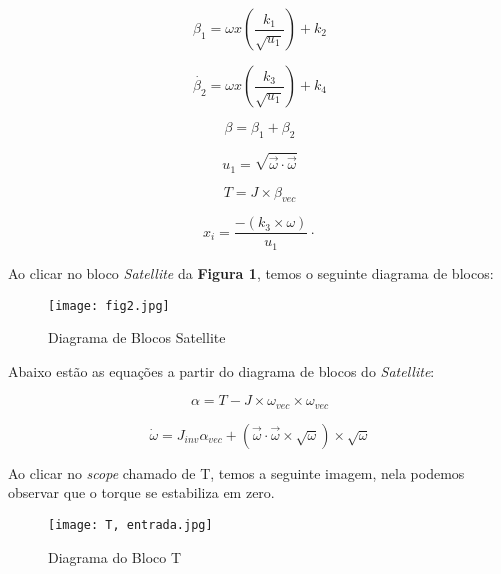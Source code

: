 \documentclass[12pt]{article}
\begin{document}
\begin{equation}
    \beta_1 = \omega x \left(\frac{k_1}{\sqrt{u_1}}\right) + k_2
\end{equation}

\begin{equation}
   \dot{\beta_2} = \omega x \left(\frac{k_3}{\sqrt{u_1}}\right) + k_4 
\end{equation}

\begin{equation}
    \beta = \beta_1 + \beta_2 
\end{equation}  

\begin{equation}
    u_1 = \sqrt{\vec{\omega} \cdot \vec{\omega} }
\end{equation}  

\begin{equation}
    T = J \times \beta_{vec} 
\end{equation}

\begin{equation}
    x_i = \frac{-(k_3 \times \omega)}{u_1} \cdot 
\end{equation}

\quad Ao clicar no bloco \emph{Satellite} da \textbf{Figura 1}, temos o seguinte diagrama de blocos:

\begin{figure}[H] 
    \centering
    \texttt{[image: fig2.jpg]}
    \caption{Diagrama de Blocos Satellite}
\end{figure}

Abaixo estão as equações a partir do diagrama de blocos do \emph{Satellite}:

\begin{itemize}

    \begin{equation}
        \alpha = T - J \times \omega_{vec} \times \omega_{vec}
    \end{equation}
    
    \begin{equation}
        \dot{\omega} = J_{inv}\alpha_{vec} + \left(\vec{\omega} \cdot \vec{\omega} \times \sqrt{\omega}\right) \times \sqrt{\omega}
    \end{equation}
\end{itemize}

\quad Ao clicar no \emph{scope} chamado de T, temos a seguinte imagem, nela podemos observar que o torque se estabiliza em zero.

\begin{figure}[H] 
    \centering
    \texttt{[image: T, entrada.jpg]}
    \caption{Diagrama do Bloco T}
\end{figure}
\end{document}
